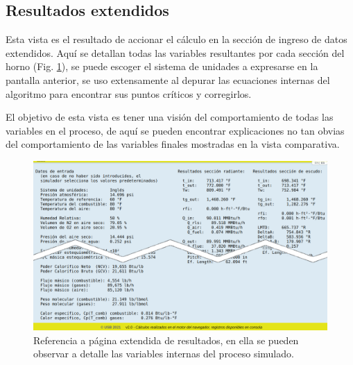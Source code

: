 \subsection{Resultados extendidos}
\par Esta vista es el resultado de accionar el cálculo en la sección de ingreso de datos extendidos. Aquí se detallan todas las variables resultantes por cada sección del horno (Fig. \ref{fig:fullresultados}), se puede escoger el sistema de unidades a expresarse en la pantalla anterior, se uso extensamente al depurar las ecuaciones internas del algoritmo para encontrar sus puntos críticos y corregirlos.
\par El objetivo de esta vista es tener una visión del comportamiento de todas las variables en el proceso, de aquí se pueden encontrar explicaciones no tan obvias del comportamiento de las variables finales mostradas en la vista comparativa.
\begin{figure}[H]
\begin{center}
\includegraphics[scale=0.3]{images/result2}
\caption[Página extendida de resultados]{Referencia a página extendida de resultados, en ella se pueden observar a detalle las variables internas del proceso simulado.}
\label{fig:fullresultados}
\end{center}
\end{figure}

